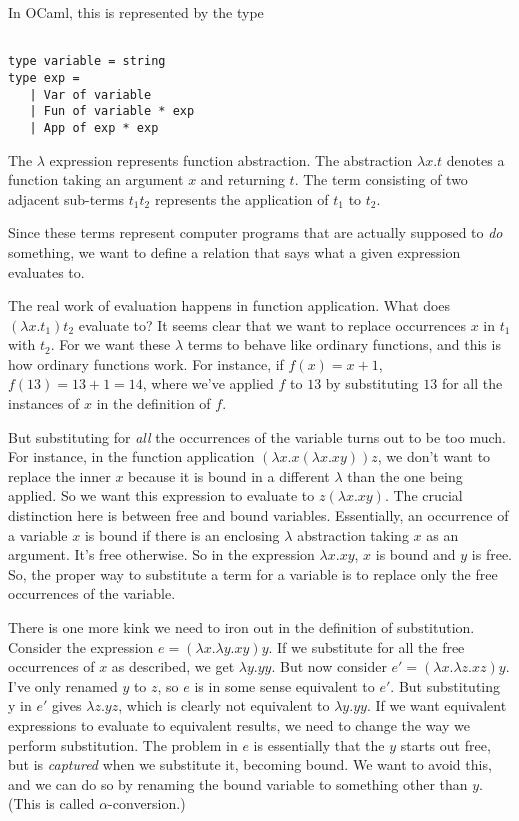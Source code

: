 \documentclass[pageno]{jpaper}
\begin{document}
{\begin{grammar}
\end{grammar}

In OCaml, this is represented by the type
\begin{lstlisting}

type variable = string
type exp = 
   | Var of variable
   | Fun of variable * exp
   | App of exp * exp

\end{lstlisting}

The $\lambda$ expression represents function abstraction. The abstraction $\lambda x.t$ denotes
a function taking an argument $x$ and returning $t$. The term consisting of two adjacent sub-terms $t_1 t_2$ represents the application of $t_1$ to $t_2$.

Since these terms represent computer programs that are actually supposed to \textit{do} something, we want to
define a relation that says what a given expression evaluates to.

The real work of evaluation happens in function application. What does $(\lambda x.t_1)t_2$ evaluate to?
It seems clear that we want to replace occurrences $x$ in $t_1$ with $t_2$.
For we want these $\lambda$ terms to behave like ordinary functions, and this is how ordinary functions work.
For instance, if $f(x) = x + 1$, $f(13) = 13 + 1 = 14$, where we've applied $f$ to $13$ by substituting
$13$ for all the instances of $x$ in the definition of $f$.

But substituting for \textit{all} the occurrences of the variable turns out to be too much.
For instance, in the function application $(\lambda x. x (\lambda x. x y)) z$, we don't want to replace the inner
$x$ because it is bound in a different $\lambda$ than the one being applied.
So we want this expression to evaluate to $z (\lambda x. x y)$. The crucial distinction here is between
free and bound variables. Essentially, an occurrence of a variable $x$ is bound if there is an enclosing $\lambda$ abstraction taking $x$ as an argument.  It's free otherwise. So in the expression $\lambda x. x y$,
$x$ is bound and $y$ is free.  So, the proper way to substitute a term for a variable is to replace only
the free occurrences of the variable. 

There is one more kink we need to iron out in the definition of substitution. Consider the expression
$e = (\lambda x. \lambda y. x y) y$. If we substitute for all the free occurrences of $x$ as described, we get
$\lambda y.y y$. But now consider $e' = (\lambda x. \lambda z. x z) y$. I've only renamed $y$ to $z$, so
$e$ is in some sense equivalent to $e'$. But substituting y in $e'$ gives $\lambda z.y z$, which is clearly not equivalent to $\lambda y. y y$. If we want equivalent expressions to evaluate to equivalent results, we need to
change the way we perform substitution. The problem in $e$ is essentially that the $y$ starts out free, but is
\textit{captured} when we substitute it, becoming bound.  We want to avoid this, and we can do so by
renaming the bound variable to something other than $y$. (This is called $\alpha$-conversion.)

}
\end{document}
